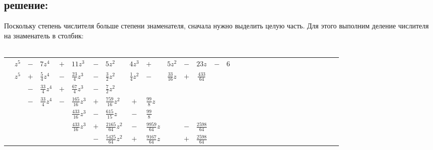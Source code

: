 \documentclass[12pt, a4paper]{article}
\begin{document}
    \subsection*{решение:}
    Поскольку степень числителя больше степени знаменателя, сначала
    нужно выделить целую часть. Для этого
    выполним деление числителя на знаменатель в столбик:\\\\
    \begin{spacing}{1.4}
        \begin{tabular}{*{15}{cp{0.55cm}}}
            &$z^5$             & $-$ & $7z^4$            & $+$ & $11z^3$             & $-$ & $5z^2$               &\vline   
            $4z^3$            & $+$ & $5z^2$            & $-$ & $23z$               & $-$ & $6$\\
            \cline{1-1}\cline{9-15}
            &$z^5$             & $+$ & $\frac{5}{4}z^4$  & $-$ & $\frac{23}{4}z^3$   & $-$ & $\frac{3}{2}z^2$     &\vline
            $\frac{1}{4}z^2$  & $-$ & $\frac{33}{16}z$  & $+$ & $\frac{433}{64}$    &     &\\
            \cline{2-8}
            &                  & $-$ & $\frac{33}{4}z^4$ & $+$ & $\frac{67}{4}z^3$   & $-$ & $\frac{7}{2}z^2$     &
                              &     &                   &     &                     &     &\\
            \cline{1-1}
            &                  & $-$ & $\frac{33}{4}z^4$ & $-$ & $\frac{165}{16}z^3$ & $+$ & $\frac{759}{16}z^2$  &
            $+$               & $\frac{99}{8}z$    &    &     &                     &     &\\
            \cline{4-10}
            &                  &     &                   &     & $\frac{433}{16}z^3$ & $-$ & $\frac{615}{15}z$    &
            $-$               & $\frac{99}{8}$     &    &     &                     &     &\\
            \cline{1-1}
            &                  &     &                   &     & $\frac{433}{16}z^3$ & $+$ & $\frac{2165}{64}z^2$ &
            $-$               & $\frac{9959}{64}z$ &    & $-$ & $\frac{2598}{64}$   &     &\\
            \cline{6-13}
            &                  &     &                   &     &                     & $-$ & $\frac{5425}{64}z^2$ &
            $+$               & $\frac{9167}{64}z$ &    & $+$ & $\frac{2598}{64}$   &     &\\
        \end{tabular}\\\\ 
    \end{spacing}
\end{document}
